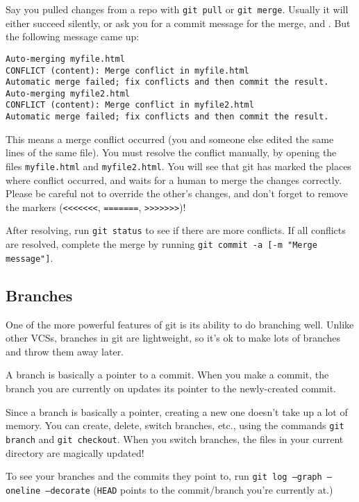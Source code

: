 \documentclass[12pt]{article}
\begin{document}
Say you pulled changes from a repo with \texttt{git pull} or \texttt{git merge}. Usually it will either succeed silently, or ask you for a commit message for the merge, and . But the following message came up:

\texttt{Auto-merging myfile.html\\
CONFLICT (content): Merge conflict in myfile.html\\
Automatic merge failed; fix conflicts and then commit the result.\\
Auto-merging myfile2.html\\
CONFLICT (content): Merge conflict in myfile2.html\\
Automatic merge failed; fix conflicts and then commit the result.
}

This means a merge conflict occurred (you and someone else edited the same lines of the same file). You must resolve the conflict manually, by opening the files \texttt{myfile.html} and \texttt{myfile2.html}. You will see that git has marked the places where conflict occurred, and waits for a human to merge the changes correctly. Please be careful not to override the other's changes, and don't forget to remove the markers (\texttt{<<<<<<<}, \texttt{=======}, \texttt{>>>>>>>})!

After resolving, run \texttt{git status} to see if there are more conflicts. If all conflicts are resolved, complete the merge by running \texttt{git commit -a [-m "Merge message"]}.

\subsection{Branches}
One of the more powerful features of git is its ability to do branching well. Unlike other VCSs, branches in git are lightweight, so it's ok to make lots of branches and throw them away later.

A branch is basically a pointer to a commit. When you make a commit, the branch you are currently on updates its pointer to the newly-created commit.

Since a branch is basically a pointer, creating a new one doesn't take up a lot of memory. You can create, delete, switch branches, etc., using the commands \texttt{git branch} and \texttt{git checkout}. When you switch branches, the files in your current directory are magically updated!

To see your branches and the commits they point to, run \texttt{git log --graph --oneline --decorate} (\texttt{HEAD} points to the commit/branch you're currently at.)
\end{document}
